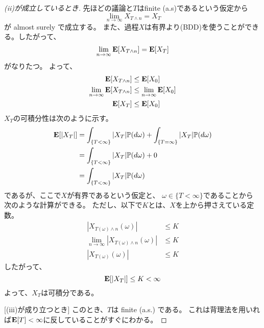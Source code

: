 \begin{proof}
        [(ii)が成立しているとき]
        先ほどの議論と$T$はfinite (a.s)であるという仮定から
        \[
          \lim_{n \to \infty}X_{T \wedge n} = X_T
        \]
        が almost surely で成立する。
        また、過程$X$は有界より(BDD)を使うことができる。したがって、
        \[
          \lim_{n \to \infty}{\mathbf{E}}[X_{T \wedge n}] = {\mathbf{E}}[X_T]
        \]
        がなりたつ。
        よって、
        \begin{align*}
          {\mathbf{E}}[X_{T \wedge n}] &\leq {\mathbf{E}}[X_0] \\
          \lim_{n \to \infty}{\mathbf{E}}[X_{T \wedge n}] &\leq \lim_{n \to \infty}{\mathbf{E}}[X_0] \\
          {\mathbf{E}}[X_T] &\leq {\mathbf{E}}[X_0]
        \end{align*}
        $X_T$の可積分性は次のように示す。
        \begin{align*}
          {\mathbf{E}}[|X_T|] &= \int_{\{T < \infty\}}|X_T|{\mathbb{P}}(d\omega) + \int_{\{T = \infty\}}|X_T|{\mathbb{P}}(d\omega) \\
          &= \int_{\{T < \infty\}}|X_T|{\mathbb{P}}(d\omega) + 0\\
          &= \int_{\{T < \infty\}}|X_T|{\mathbb{P}}(d\omega)
        \end{align*}
        であるが、ここで$X$が有界であるという仮定と、
        $\omega \in \{T < \infty\}$であることから
        次のような計算ができる。
        ただし、以下で$K$とは、$X$を上から押さえている定数。
        \begin{align*}
          |X_{T(\omega) \wedge n}(\omega)| &\leq K \\
          \lim_{n \to \infty}|X_{T(\omega) \wedge n}(\omega)| &\leq K \\
          |X_{T(\omega)}(\omega)| &\leq K
        \end{align*}
        したがって、
        \[
          {\mathbf{E}}[|X_T|] \leq K < \infty
        \]
        よって、$X_T$は可積分である。

        [(iii)が成り立つとき]
        このとき、$T$は finite (a.s.) である。
        これは背理法を用いれば${\mathbf{E}}[T] < \infty$に反していることがすぐにわかる。


















      \end{proof}
